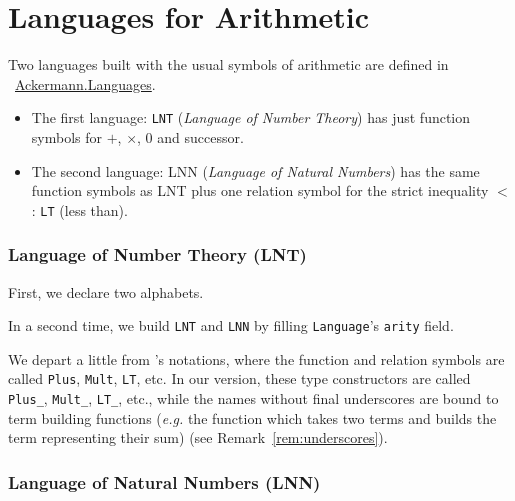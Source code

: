 

\section{Languages for Arithmetic}



Two languages built with the usual symbols of arithmetic are 
defined in ~\href{../theories/html/hydras.Ackermann.Languages.html}{Ackermann.Languages}.

\begin{itemize}
\item The first language: \texttt{LNT} (\emph{Language of Number Theory}) has just function symbols for $+$, $\times$, $0$ and successor.
\item The second language: LNN (\emph{Language of Natural Numbers})  has
the same function symbols as LNT plus one relation symbol for the strict inequality $<$ : \texttt{LT} (less than).
\end{itemize}

\subsubsection{Language of Number Theory (LNT)}

First, we declare two alphabets.


In a second time, we build \texttt{LNT} and \texttt{LNN} by filling \texttt{Language}'s \texttt{arity} field.


\begin{remark}
  We depart a little from \cite{Goedel}'s notations, where the 
function and relation symbols are called \texttt{Plus}, 
\texttt{Mult}, \texttt{LT}, etc. In our version, these type constructors are called \texttt{Plus\_}, 
\texttt{Mult\_}, \texttt{LT\_}, etc., while the names without final underscores are bound to term building functions (\emph{e.g.}
the function which takes two terms and builds the term representing their sum) (see Remark~\ref{rem:underscores}).
\end{remark}


\subsubsection{Language of Natural Numbers (LNN)}

